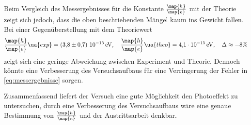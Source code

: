Beim Vergleich des Messergebnisses für die Konstante $\frac{\map{h}}{\map{e}}$ mit der Theorie
zeigt sich jedoch, dass die oben beschriebenden Mängel kaum ins Gewicht fallen.
Bei einer Gegenüberstellung mit dem Theoriewert\cite{scipy} %
\begin{equation}
  \label{eq:abweichung}
  \frac{\map{h}}{\map{e}}\ua{exp}=\left(\num{3.8\pm 0.7}\right)\,\num{e-15}\,\si{\eV}, \quad  \frac{\map{h}}{\map{e}}\ua{theo}=\num{4.1 e-15}\,\si{\eV}, \quad \Delta\approx -8\%
\end{equation}
zeigt sich eine geringe Abweichung zwischen Experiment und Theorie.
Dennoch könnte eine Verbesserung des Versuchsaufbaus
für eine Verringerung der Fehler in \eqref{eq:messergebnisse} sorgen.

Zusammenfassend liefert der Versuch eine gute Möglichkeit den Photoeffekt zu untersuchen, %
durch eine Verbesserung des Versuchsaufbaus wäre eine genaue Bestimmung von $\frac{\map{h}}{\map{e}}$
und der Austrittsarbeit denkbar.
